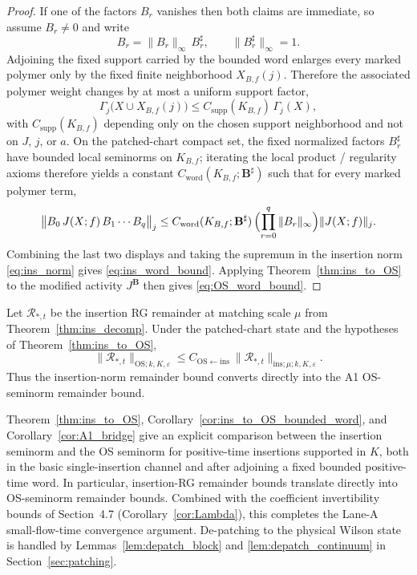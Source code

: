 \begin{proof}
If one of the factors $B_r$ vanishes then both claims are immediate, so assume $B_r\neq 0$ and write
\[
B_r=\|B_r\|_\infty\,B_r^{\sharp},
\qquad
\|B_r^{\sharp}\|_\infty=1.
\]
Adjoining the fixed support carried by the bounded word enlarges every marked polymer only by the fixed finite neighborhood $X_{B,f}(j)$.
Therefore the associated polymer weight changes by at most a uniform support factor,
\[
\Gamma_j\bigl(X\cup X_{B,f}(j)\bigr)
\le
C_{\mathrm{supp}}(K_{B,f})\,\Gamma_j(X),
\]
with $C_{\mathrm{supp}}(K_{B,f})$ depending only on the chosen support neighborhood and not on $J$, $j$, or $a$.
On the patched-chart compact set, the fixed normalized factors $B_r^{\sharp}$ have bounded local seminorms on $K_{B,f}$; iterating the local product / regularity axioms therefore yields a constant
$C_{\mathrm{word}}(K_{B,f};\mathbf B^{\sharp})$ such that for every marked polymer term,
\[
\bigl\|B_0\,J(X;f)\,B_1\cdots B_q\bigr\|_j
\le
C_{\mathrm{word}}(K_{B,f};\mathbf B^{\sharp})\,
\Bigl(\prod_{r=0}^{q}\|B_r\|_\infty\Bigr)
\|J(X;f)\|_j.
\]
Combining the last two displays and taking the supremum in the insertion norm \eqref{eq:ins_norm} gives \eqref{eq:ins_word_bound}.
Applying Theorem~\ref{thm:ins_to_OS} to the modified activity $J^{\mathbf B}$ then gives \eqref{eq:OS_word_bound}.
\end{proof}

\begin{corollary}\label{cor:A1_bridge}
Let $\mathcal R_{*,t}$ be the insertion RG remainder at matching scale $\mu$ from Theorem~\ref{thm:ins_decomp}.
Under the patched-chart state and the hypotheses of Theorem~\ref{thm:ins_to_OS},
\[
\|\mathcal R_{*,t}\|_{\mathrm{OS};k,K,\varepsilon}
\le C_{\mathrm{OS}\leftarrow\mathrm{ins}}\ \|\mathcal R_{*,t}\|_{\mathrm{ins};\mu;k,K,\varepsilon}.
\]
Thus the insertion-norm remainder bound converts directly into the A1 OS-seminorm remainder bound.
\end{corollary}

\begin{remark}
Theorem~\ref{thm:ins_to_OS}, Corollary~\ref{cor:ins_to_OS_bounded_word}, and Corollary~\ref{cor:A1_bridge} give an explicit comparison between the insertion seminorm
and the OS seminorm for positive-time insertions supported in $K$, both in the basic single-insertion channel and after adjoining a fixed bounded positive-time word.  In particular, insertion-RG remainder bounds
translate directly into OS-seminorm remainder bounds.
Combined with the coefficient invertibility bounds of Section~4.7 (Corollary~\ref{cor:Lambda}), this completes the
Lane-A small-flow-time convergence argument.  De-patching to the physical Wilson state is handled by
Lemmas~\ref{lem:depatch_block} and \ref{lem:depatch_continuum} in Section~\ref{sec:patching}.
\end{remark}

